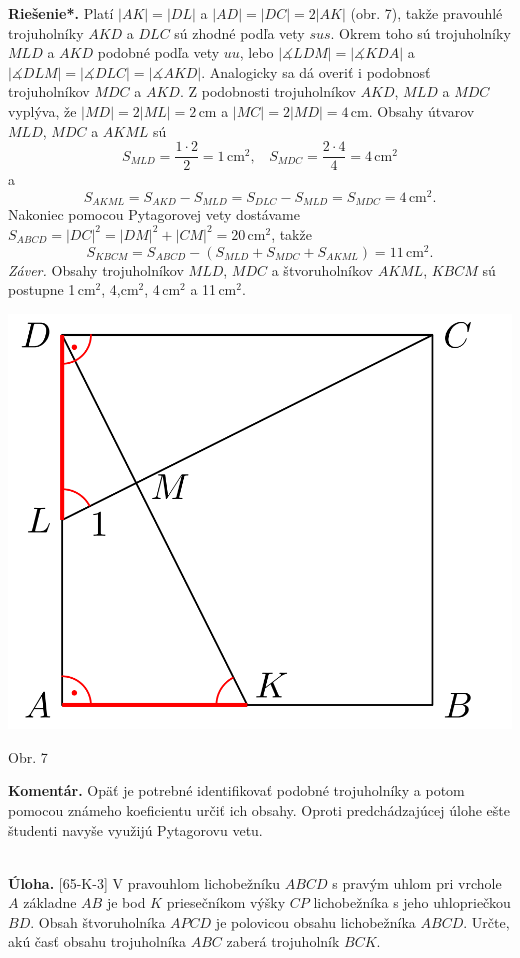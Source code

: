 \documentclass[11pt,a4paper,oneside,final]{book}
\newcommand{\kom}{\textbf{Komentár.} }
\newcommand{\ul}{\textbf{Úloha.} }
\newcommand{\rieh}{\textbf{Riešenie*.} }
\newcommand{\ma}{\measuredangle}
\begin{document}
\rieh Platí $|AK| = |DL|$ a $|AD| = |DC| = 2|AK|$ (obr. 7), takže pravouhlé trojuholníky $AKD$ a $DLC$ sú zhodné podľa vety $sus$. Okrem toho sú trojuholníky $MLD$ a $AKD$ podobné podľa vety $uu$, lebo $|\ma LDM| = |\ma KDA|$ a $|\ma DLM| = |\ma DLC| = |\ma AKD|$. Analogicky sa dá overiť i podobnosť trojuholníkov $MDC$ a $AKD$. Z podobnosti trojuholníkov $AKD$, $MLD$ a $MDC$ vyplýva, že $|MD| = 2|ML| = 2$\,cm a $|MC| = 2|MD| = 4$\,cm. Obsahy útvarov $MLD$, $MDC$ a $AKML$ sú
$$S_{MLD} =\frac{1\cdot 2}{2}= 1\,\text{cm}^2, \ \ \ \  S_{MDC} = \frac{2\cdot 4}{4}= 4\,\text{cm}^2$$
a
$$S_{AKML} = S_{AKD}- S_{MLD} = S_{DLC} - S_{MLD} = S_{MDC} = 4\,\text{cm}^2.$$
Nakoniec pomocou Pytagorovej vety dostávame $S_{ABCD} = |DC|^2 = |DM|^2 + |CM|^2= 20$\,cm$^2$, takže
$$S_{KBCM} = S_{ABCD} - (S_{MLD} + S_{MDC} + S_{AKML}) = 11\,\text{cm}^2.$$
\textit{Záver.} Obsahy trojuholníkov $MLD$, $MDC$ a štvoruholníkov $AKML$, $KBCM$ sú postupne 1\,cm$^2$, 4,cm$^2$, 4\,cm$^2$ a 11\,cm$^2$.
\begin{center}
\includegraphics{63D41} 

Obr. 7
\end{center}
\kom Opäť je potrebné identifikovať podobné trojuholníky a potom pomocou známeho koeficientu určiť ich obsahy. Oproti predchádzajúcej úlohe ešte študenti navyše využijú Pytagorovu vetu.\\
\\
\begin{tcolorbox}[breakable,notitle,boxrule=0pt,colback=light-gray,colframe=light-gray]\ul [65-K-3] V pravouhlom lichobežníku $ABCD$ s pravým uhlom pri vrchole $A$ základne $AB$ je bod $K$ priesečníkom výšky $CP$ lichobežníka s jeho uhlopriečkou $BD$. Obsah štvoruholníka $APCD$ je polovicou obsahu lichobežníka $ABCD$. Určte, akú časť obsahu trojuholníka $ABC$ zaberá trojuholník $BCK$.

\end{tcolorbox}
\end{document}
